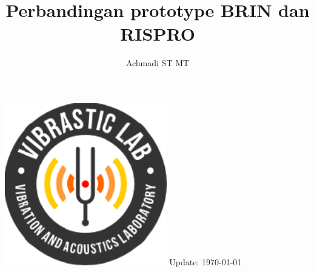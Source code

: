 \documentclass[12pt,a4paper,landscape]{article}
\title{\LARGE \bf
	Perbandingan prototype BRIN dan RISPRO\\
}
\author{Achmadi ST MT}
\date{}
\begin{document}
	\pagestyle{empty}
	
	\begin{titlepage}
		\centering
		\vfill
		\vfill
		\maketitle
		\vfill
		\includegraphics[width=200pt]{images/logo/logoviblab}
		\vfill
		\vfill
		Update: {\today} \currenttime \\
	\end{titlepage}
	
	
\end{document}
